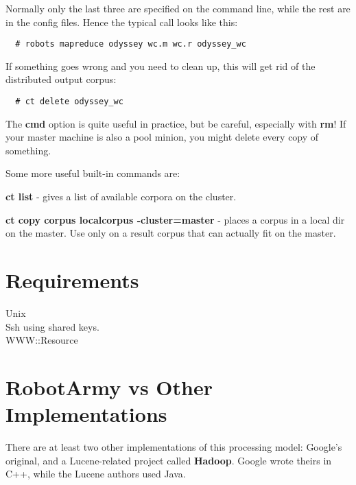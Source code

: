 \documentclass{tufte-handout}
\begin{document}
Normally only the last three are specified on the command line, while the rest are in the config files. Hence the typical call looks like this:

\begin{verbatim}
  # robots mapreduce odyssey wc.m wc.r odyssey_wc
\end{verbatim}


If something goes wrong and you need to clean up, this will get rid of the distributed output corpus:

\begin{verbatim}
  # ct delete odyssey_wc
\end{verbatim}


The \textbf{cmd} option is quite useful in practice, but be careful, especially with \textbf{rm}! If your master machine is also a pool minion, you might delete every copy of something.



Some more useful built-in commands are:



\textbf{ct list} - gives a list of available corpora on the cluster.



\textbf{ct copy corpus localcorpus -cluster=master} - places a corpus in a local dir on the master. Use only on a result corpus that can actually fit on the master.

\section{Requirements\label{Requirements}}
\begin{description}

\item[{Unix}] \mbox{}
\item[{Ssh using shared keys.}] \mbox{}
\item[{WWW::Resource}] \mbox{}\end{description}
\section{RobotArmy vs Other Implementations\label{RobotArmy_vs_Other_Implementations}}


There are at least two other implementations of this processing model: Google's original, and a Lucene-related project called \textbf{Hadoop}. Google wrote theirs in C++, while the Lucene authors used Java.
\end{document}
